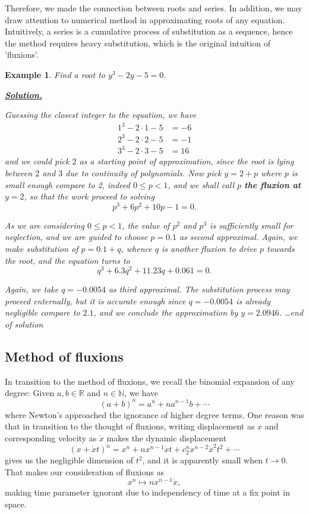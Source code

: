 \documentclass[12pt]{article}
\newtheorem*{example}{Example}
\newenvironment{solution}{\begin{snugshade*} \underline{\textbf{Solution.}} \par}{\hfill \textit{\dots end of solution} \end{snugshade*}}
\begin{document}
    Therefore, we made the connection between roots and series. In addition, we may draw attention to numerical method in approximating roots of any equation. Intuitively, a series is a cumulative process of substitution as a sequence, hence the method requires heavy substitution, which is the original intuition of 'fluxions'.

    \begin{example}
        Find a root to $y^3-2y-5=0$.

        \begin{solution}
            Guessing the closest integer to the equation, we have \begin{align*}
                1^3-2\cdot 1-5&=-6\\
                2^3-2\cdot 2-5&=-1\\
                3^3-2\cdot 3-5&=16
            \end{align*}
            and we could pick $2$ as a starting point of approximation, since the root is lying between $2$ and $3$ due to continuity of polynomials. Now pick $y=2+p$ where $p$ is small enough compare to 2, indeed $0\leq p<1$, and we shall call $p$ \textbf{the fluxion at $y=2$}, so that the work proceed to solving \[p^3+6p^2+10p-1=0.\]

            As we are considering $0\leq p < 1$, the value of $p^2$ and $p^3$ is sufficiently small for neglection, and we are guided to choose $p=0.1$ as second approximal. Again, we make substitution of $p=0.1+q$, whence $q$ is another fluxion to drive $p$ towards the root, and the equation turns to \[q^3+6.3q^2+11.23q+0.061=0.\]

            Again, we take $q=-0.0054$ as third approximal. The substitution process may proceed enternally, but it is accurate enough since $q=-0.0054$ is already negligible compare to $2.1$, and we conclude the approximation by $y=2.0946$.
        \end{solution}
    \end{example}

    \subsection*{Method of fluxions}

    In transition to the method of fluxions, we recall the binomial expansion of any degree: Given $a,b\in\mathbb{R}$ and $n\in\mathbb{N}$, we have \[(a+b)^n=a^n+na^{n-1}b+\cdots\] where Newton's approached the ignorance of higher degree terms. One reason was that in transition to the thought of fluxions, writing displacement as $x$ and corresponding velocity as $\dot{x}$ makes the dynamic displacement \[(x+\dot{x}t)^n=x^n+nx^{n-1}\dot{x}t+c_2^n x^{n-2}\dot{x}^2 t^2+\cdots\] gives us the negligible dimension of $t^2$, and it is apparently small when $t\to 0$. That makes our consideration of fluxions as \[x^n \mapsto nx^{n-1}\dot{x},\] making time parameter ignorant due to independency of time at a fix point in space.
\end{document}
